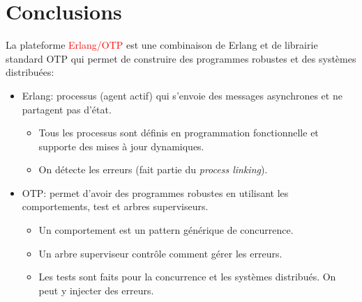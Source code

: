 \documentclass{report}
\begin{document}
\section{Conclusions}
La plateforme \textcolor{red}{Erlang/OTP} est une combinaison de Erlang et de librairie standard OTP qui permet de construire des programmes robustes et des systèmes distribuées:
\begin{itemize}
\item Erlang: processus (agent actif) qui s'envoie des messages asynchrones et ne partagent pas d'état.
	\begin{itemize}
	\item Tous les processus sont définis en programmation fonctionnelle et supporte des mises à jour dynamiques.
	\item On détecte les erreurs (fait partie du \textit{process linking}).
	\end{itemize}
\item OTP: permet d'avoir des programmes robustes en utilisant les comportements, test et arbres superviseurs.
	\begin{itemize}
	\item Un comportement est un pattern générique de concurrence. 
	\item Un arbre superviseur contrôle comment gérer les erreurs.
	\item Les tests sont faits pour la concurrence et les systèmes distribués. On peut y injecter des erreurs.
	\end{itemize}
\end{itemize}
\end{document}
